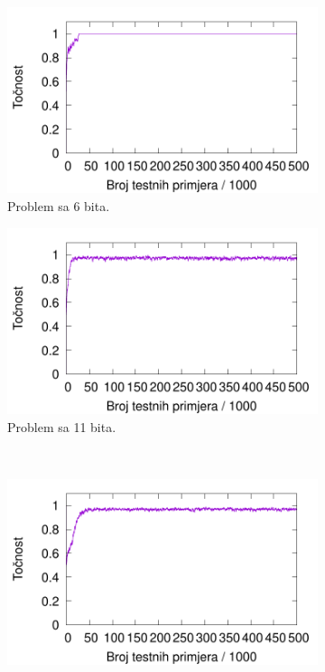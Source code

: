 \documentclass[times, utf8, zavrsni]{fer}
\begin{document}
\begin{figure}
    \centering
    \begin{subfigure}{0.496\textwidth}
        \centering
        \includegraphics[width=\textwidth]{img/multiplexer/6muxre.pdf}
        \caption{Problem sa 6 bita.}
        \label{fig:6muxre}
    \end{subfigure}
    \begin{subfigure}{0.496\textwidth}
        \centering
        \includegraphics[width=\textwidth]{img/multiplexer/11muxre.pdf}
        \caption{Problem sa 11 bita.}
        \label{fig:11muxre}
    \end{subfigure} \\
    \begin{subfigure}{0.496\textwidth}
        \centering
        \includegraphics[width=\textwidth]{img/multiplexer/20muxre.pdf}

\end{subfigure}
\end{figure}
\end{document}
